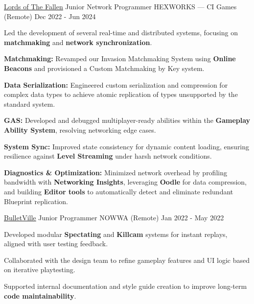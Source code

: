 \begin{cventries}
  \cventry
    {\href{https://wizardcell.com/about/lords-of-the-fallen}{\underline{Lords of The Fallen}}}
    {Junior Network Programmer}
    {HEXWORKS — CI Games (Remote)}
    {Dec 2022 - Jun 2024}
    {
      \begin{cvitems}
        \item {Led the development of several real-time and distributed systems, focusing on \textbf{matchmaking} and \textbf{network synchronization}.}
        \item {\textbf{Matchmaking:} Revamped our Invasion Matchmaking System using \textbf{Online Beacons} and provisioned a Custom Matchmaking by Key system.}
        \item {\textbf{Data Serialization:} Engineered custom serialization and compression for complex data types to achieve atomic replication of types unsupported by the standard system.}
        \item {\textbf{GAS:} Developed and debugged multiplayer-ready abilities within the \textbf{Gameplay Ability System}, resolving networking edge cases.}
        \item {\textbf{System Sync:} Improved state consistency for dynamic content loading, ensuring resilience against \textbf{Level Streaming} under harsh network conditions.}
        \item {\textbf{Diagnostics \& Optimization:} Minimized network overhead by profiling bandwidth with \textbf{Networking Insights}, leveraging \textbf{Oodle} for data compression, and building \textbf{Editor tools} to automatically detect and eliminate redundant Blueprint replication.}
      \end{cvitems}
    }

  \cventry
    {\href{https://wizardcell.com/about/bulletville}{\underline{BulletVille}}}
    {Junior Programmer}
    {NOWWA (Remote)}
    {Jan 2022 - May 2022}
    {
      \begin{cvitems}
        \item {Developed modular \textbf{Spectating} and \textbf{Killcam} systems for instant replays, aligned with user testing feedback.}
        \item {Collaborated with the design team to refine gameplay features and UI logic based on iterative playtesting.}
        \item {Supported internal documentation and style guide creation to improve long-term \textbf{code maintainability}.}
      \end{cvitems}
    }


\end{cventries}
